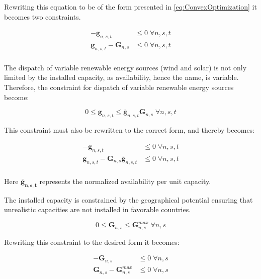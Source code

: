 Rewriting this equation to be of the form presented in \ref{eq:ConvexOptimization} it becomes two constraints. 

\begin{equation}
\begin{split}
-\mathbf{g}_{n,s,t} & \leq 0 \; \forall n,s,t  \\
\mathbf{g}_{n,s,t} - \mathbf{G}_{n,s} & \leq 0  \; \forall n,s,t\\
\end{split}
\end{equation}

The dispatch of variable renewable energy sources (wind and solar) is not only limited by the installed capacity, as availability, hence the name, is variable. Therefore, the constraint for dispatch of variable renewable energy sources become:

\begin{equation}
0 \leq \mathbf{g}_{n,s,t} \leq \mathbf{\overline{g}}_{n,s,t} \mathbf{G}_{n,s} \; \forall n,s,t
\end{equation}

This constraint must also be rewritten to the correct form, and thereby becomes: 

\begin{equation}
\begin{split}
-\mathbf{g}_{n,s,t} & \leq 0 \; \forall n,s,t  \\
\mathbf{g}_{n,s,t} - \mathbf{G}_{n,s}  \mathbf{\overline{g}}_{n,s,t} & \leq 0  \; \forall n,s,t\\
\end{split}
\end{equation}

Here $\mathbf{\overline{g}_{n,s,t}}$ represents the normalized availability per unit capacity. 

The installed capacity is constrained by the geographical potential ensuring that unrealistic capacities are not installed in favorable countries. 

\begin{equation}
0 \leq \mathbf{G}_{n,s} \leq \mathbf{G}_{n,s}^{max} \; \forall n,s
\end{equation}

Rewriting this constraint to the desired form it becomes:

\begin{equation}
\begin{split}
- \mathbf{G}_{n,s}   & \leq 0  \; \forall n,s\\
\mathbf{G}_{n,s} -\mathbf{G}_{n,s}^{max}   & \leq 0  \; \forall n,s\\
\end{split}
\end{equation}

